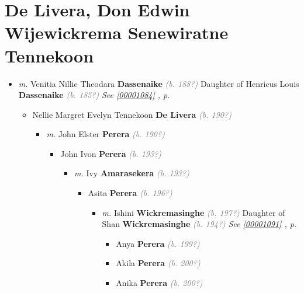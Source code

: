 \documentclass[10pt, openany]{book}
\begin{document}
\chapter{De Livera, Don Edwin Wijewickrema Senewiratne Tennekoon}
\label{00001138}
\textcolor{slmaroon}{\textit{}}
\begin{itemize}
\item{\textit{m.} Venitia Nillie Theodara \textbf{Dassenaike} \textcolor{gray}{\textit{(b. 188?)}} Daughter of  Henricus Louis \textbf{Dassenaike} \textcolor{gray}{\textit{(b. 185?)}} \textcolor{slteal}{\textit{See  \autoref{00001084} \textit{, p. \pageref{00001084} }}}   \label{couple:00001083:00001138} \begin{itemize}
\item{Nellie Margret Evelyn Tennekoon \textbf{De Livera} \textcolor{gray}{\textit{(b. 190?)}}
\begin{itemize}
\item{\textit{m.} John Elster \textbf{Perera} \textcolor{gray}{\textit{(b. 190?)}}   \label{couple:00001085:00001086} \begin{itemize}
\item{John Ivon \textbf{Perera} \textcolor{gray}{\textit{(b. 193?)}}
\begin{itemize}
\item{\textit{m.} Ivy \textbf{Amarasekera} \textcolor{gray}{\textit{(b. 193?)}}   \label{couple:00001087:00001088} \begin{itemize}
\item{Asita \textbf{Perera} \textcolor{gray}{\textit{(b. 196?)}}
\begin{itemize}
\item{\textit{m.} Ishini \textbf{Wickremasinghe} \textcolor{gray}{\textit{(b. 197?)}} Daughter of  Shan \textbf{Wickremasinghe} \textcolor{gray}{\textit{(b. 194?)}} \textcolor{slteal}{\textit{See  \autoref{00001091} \textit{, p. \pageref{00001091} }}}   \label{couple:00001089:00001090} \begin{itemize}
\item{Anya \textbf{Perera} \textcolor{gray}{\textit{(b. 199?)}}
 }
\item{Akila \textbf{Perera} \textcolor{gray}{\textit{(b. 200?)}}
 }
\item{Anika \textbf{Perera} \textcolor{gray}{\textit{(b. 200?)}}
 }
\end{itemize}}
\end{itemize}
 }
\end{itemize}}

\end{itemize}}
\end{itemize}}
\end{itemize}}
\end{itemize}}
\end{itemize}
\end{document}
